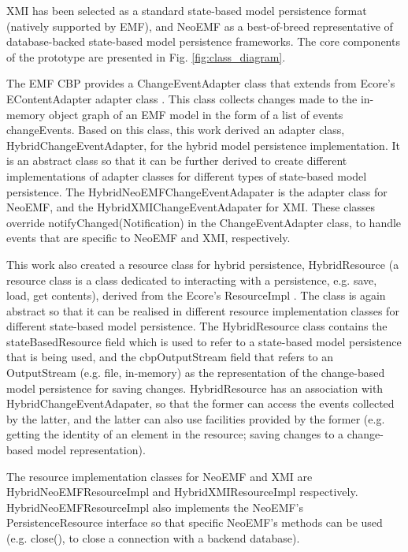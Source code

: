 XMI has been selected as a standard state-based model persistence format (natively supported by EMF), and NeoEMF as a best-of-breed representative of database-backed state-based model persistence frameworks. The core components of the prototype are presented in Fig. \ref{fig:class_diagram}. 

The EMF CBP provides a \textsf{ChangeEventAdapter} class \cite{DBLP:conf/models/YohannisKP17} that extends from Ecore's \textsf{EContentAdapter} adapter class \cite{eclipse2018eContentAdapter}
. This class collects changes made to the in-memory object graph of an EMF model in the form of a list of events \textsf{changeEvents}. Based on this class, this work derived an adapter class, \textsf{HybridChangeEventAdapter}, for the hybrid model persistence implementation. It is an abstract class so that it can be further derived to create different implementations of adapter classes for different types of state-based model persistence. The \textsf{HybridNeoEMFChangeEventAdapater} is the adapter class for NeoEMF, and the \textsf{HybridXMIChangeEventAdapater} for XMI. These classes override \textsf{notifyChanged}(\textsf{Notification}) in the \textsf{ChangeEventAdapter} class, to handle events that are specific to NeoEMF and XMI, respectively.

This work also created a resource class for hybrid persistence, \textsf{HybridResource} (a resource class is a class dedicated to interacting with a persistence, e.g. save, load, get contents), derived from the Ecore's \textsf{ResourceImpl} \cite{eclipse2018resourceImpl}
. The class is again abstract so that it can be realised in different resource implementation classes for different state-based model persistence. The \textsf{HybridResource} class contains the \textsf{stateBasedResource} field which is used to refer to a state-based model persistence that is being used, and the \textsf{cbpOutputStream} field that refers to an \textsf{OutputStream} (e.g. file, in-memory) as the representation of the change-based model persistence for saving changes. \textsf{HybridResource} has an association with \textsf{HybridChangeEventAdapater}, so that the former can access the events collected by the latter, and the latter can also use facilities provided by the former (e.g. getting the identity of an element in the resource; saving changes to a change-based model representation).

The resource implementation classes for NeoEMF and XMI are \textsf{HybridNeoEMFResourceImpl} and \textsf{HybridXMIResourceImpl} respectively. \textsf{HybridNeoEMFResourceImpl} also implements the NeoEMF's \textsf{PersistenceResource} interface \cite{atlanmod2018persistentResource}
so that specific NeoEMF's methods can be used (e.g. \textsf{close}(), to close a connection with a backend database).

